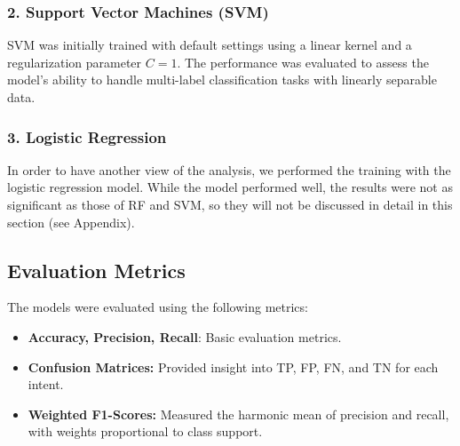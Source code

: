         \subsubsection*{2. Support Vector Machines (SVM) \\}
        
        
            SVM was initially trained with default settings using a linear kernel and a regularization parameter \( C = 1 \). The performance was evaluated to assess the model's ability to handle multi-label classification tasks with linearly separable data.

        \subsubsection*{3. Logistic Regression \\}
        
        
            In order to have another view of the analysis, we performed the training with the logistic regression model. While the model performed well, the results were not as significant as those of RF and SVM, so they will not be discussed in detail in this section (see Appendix).

    \subsection{Evaluation Metrics}
    
        The models were evaluated using the following metrics:
        
        \begin{itemize}
        
            \item \textbf{Accuracy, Precision, Recall}: Basic evaluation metrics.
            
            \item \textbf{Confusion Matrices:} Provided insight into TP, FP, FN, and TN for each intent.
            
            \item \textbf{Weighted F1-Scores:} Measured the harmonic mean of precision and recall, with weights proportional to class support.
        
        \end{itemize}

